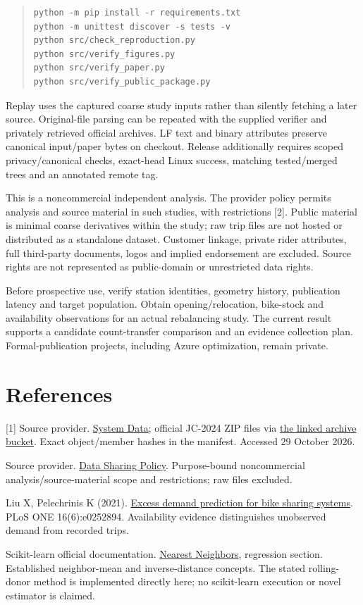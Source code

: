 \documentclass[11pt]{article}
\begin{document}
\begin{quote}\small\begin{verbatim}
python -m pip install -r requirements.txt
python -m unittest discover -s tests -v
python src/check_reproduction.py
python src/verify_figures.py
python src/verify_paper.py
python src/verify_public_package.py
\end{verbatim}\end{quote}

Replay uses the captured coarse study inputs rather than silently fetching a later source. Original-file parsing can be repeated with the supplied verifier and privately retrieved official archives. LF text and binary attributes preserve canonical input/paper bytes on checkout. Release additionally requires scoped privacy/canonical checks, exact-head Linux success, matching tested/merged trees and an annotated remote tag.

This is a noncommercial independent analysis. The provider policy permits analysis and source material in such studies, with restrictions [2]. Public material is minimal coarse derivatives within the study; raw trip files are not hosted or distributed as a standalone dataset. Customer linkage, private rider attributes, full third-party documents, logos and implied endorsement are excluded. Source rights are not represented as public-domain or unrestricted data rights.

Before prospective use, verify station identities, geometry history, publication latency and target population. Obtain opening/relocation, bike-stock and availability observations for an actual rebalancing study. The current result supports a candidate count-transfer comparison and an evidence collection plan. Formal-publication projects, including Azure optimization, remain private.

\section*{References}\small
[1] Source provider. \href{https://citibikenyc.com/system-data}{System Data}; official JC-2024 ZIP files via \href{https://s3.amazonaws.com/tripdata/index.html}{the linked archive bucket}. Exact object/member hashes in the manifest. Accessed 29 October 2026.\par
[2] Source provider. \href{https://citibikenyc.com/data-sharing-policy}{Data Sharing Policy}. Purpose-bound noncommercial analysis/source-material scope and restrictions; raw files excluded.\par
[3] Liu X, Pelechrinis K (2021). \href{https://doi.org/10.1371/journal.pone.0252894}{Excess demand prediction for bike sharing systems}. PLoS ONE 16(6):e0252894. Availability evidence distinguishes unobserved demand from recorded trips.\par
[4] Scikit-learn official documentation. \href{https://scikit-learn.org/stable/modules/neighbors.html}{Nearest Neighbors}, regression section. Established neighbor-mean and inverse-distance concepts. The stated rolling-donor method is implemented directly here; no scikit-learn execution or novel estimator is claimed.
\end{document}
